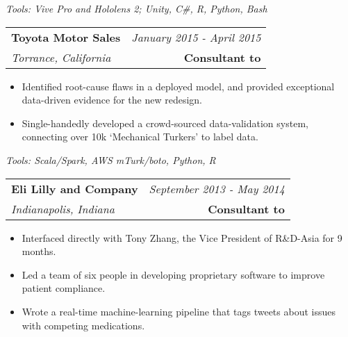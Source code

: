 \documentclass[10pt,a4paper]{article}
\begin{document}
  \vspace*{2mm}\setlength\parindent{2mm}\begin{minipage}{16.8cm}
    \textit{Tools: Vive Pro and Hololens 2; Unity, C\#, R, Python, Bash}
  \end{minipage}

  \vspace*{3mm}\noindent\begin{tabularx}{17cm}{X r}
    \textbf{Toyota Motor Sales} & \textit{January 2015 - April 2015} \\
    \textit{Torrance, California} & \textbf{Consultant to} \\
  \end{tabularx}

  \vspace*{1mm}\noindent\begin{minipage}{17cm}
    \begin{itemize}[leftmargin=6mm,topsep=0mm,itemsep=-1mm]
      \item Identified root-cause flaws in a deployed model, and provided exceptional data-driven evidence for the new redesign.
      \item Single-handedly developed a crowd-sourced data-validation system, connecting over 10k `Mechanical Turkers' to label data.
    \end{itemize}
  \end{minipage}

  \vspace*{2mm}\setlength\parindent{2mm}\begin{minipage}{16.8cm}
    \textit{Tools: Scala/Spark, AWS mTurk/boto, Python, R }
  \end{minipage}

  \vspace*{3mm}\noindent\begin{tabularx}{17cm}{X r}
    \textbf{Eli Lilly and Company} & \textit{September 2013 - May 2014} \\
    \textit{Indianapolis, Indiana} & \textbf{Consultant to} 
  \end{tabularx}

  \vspace*{1mm}\noindent\begin{minipage}{17cm}
    \begin{itemize}[leftmargin=6mm, topsep=0mm, itemsep=-1mm]
      \item Interfaced directly with Tony Zhang, the Vice President of R\&D-Asia for 9 months.
      \item Led a team of six people in developing proprietary software to improve patient compliance.
      \item Wrote a real-time machine-learning pipeline that tags tweets about issues with competing medications.
    \end{itemize}
  \end{minipage}
\end{document}
